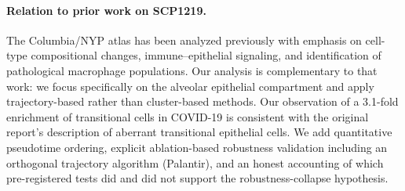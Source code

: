 \documentclass[11pt]{article}
\begin{document}
\paragraph{Relation to prior work on SCP1219.} The Columbia/NYP atlas \citep{Melms2021} has been analyzed previously with emphasis on cell-type compositional changes, immune--epithelial signaling, and identification of pathological macrophage populations. Our analysis is complementary to that work: we focus specifically on the alveolar epithelial compartment and apply trajectory-based rather than cluster-based methods. Our observation of a 3.1-fold enrichment of transitional cells in COVID-19 is consistent with the original report's description of aberrant transitional epithelial cells. We add quantitative pseudotime ordering, explicit ablation-based robustness validation including an orthogonal trajectory algorithm (Palantir), and an honest accounting of which pre-registered tests did and did not support the robustness-collapse hypothesis.
\end{document}
